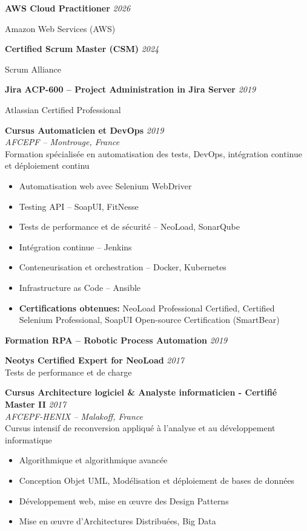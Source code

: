 \documentclass[11pt,a4paper]{article}
\begin{document}
\textbf{AWS Cloud Practitioner} \hfill \textit{2026}

Amazon Web Services (AWS)

\textbf{Certified Scrum Master (CSM)} \hfill \textit{2024}

Scrum Alliance

\textbf{Jira ACP-600 -- Project Administration in Jira Server} \hfill \textit{2019}

Atlassian Certified Professional

\textbf{Cursus Automaticien et DevOps} \hfill \textit{2019}\\
\textit{AFCEPF -- Montrouge, France}\\
Formation spécialisée en automatisation des tests, DevOps, intégration continue et déploiement continu
\begin{itemize}
    \item Automatisation web avec Selenium WebDriver
    \item Testing API -- SoapUI, FitNesse
    \item Tests de performance et de sécurité -- NeoLoad, SonarQube
    \item Intégration continue -- Jenkins
    \item Conteneurisation et orchestration -- Docker, Kubernetes
    \item Infrastructure as Code -- Ansible
    \item \textbf{Certifications obtenues:} NeoLoad Professional Certified, Certified Selenium Professional, SoapUI Open-source Certification (SmartBear)
\end{itemize}

\textbf{Formation RPA -- Robotic Process Automation} \hfill \textit{2019}

\textbf{Neotys Certified Expert for NeoLoad} \hfill \textit{2017}\\
Tests de performance et de charge

\textbf{Cursus Architecture logiciel \& Analyste informaticien - Certifié Master II} \hfill \textit{2017}\\
\textit{AFCEPF-HENIX -- Malakoff, France}\\
Cursus intensif de reconversion appliqué à l'analyse et au développement informatique
\begin{itemize}
    \item Algorithmique et algorithmique avancée
    \item Conception Objet UML, Modélisation et déploiement de bases de données
    \item Développement web, mise en œuvre des Design Patterns
    \item Mise en œuvre d'Architectures Distribuées, Big Data
\end{itemize}
\end{document}
